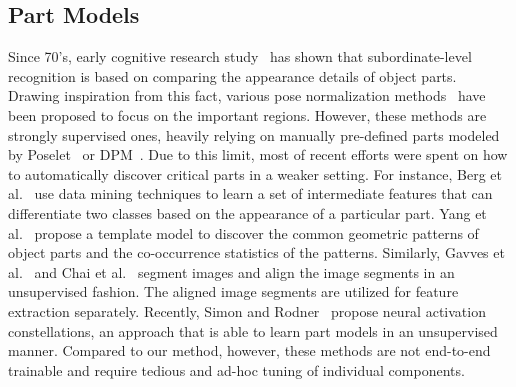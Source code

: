 \documentclass[10pt,twocolumn,letterpaper]{article}
\begin{document}
\subsection{Part Models}
Since 70's, early cognitive research study~\cite{Rosch76} has shown that subordinate-level recognition is based on comparing the appearance details of object parts.
Drawing inspiration from this fact, various pose normalization methods~\cite{FarrellOZMDD11,ZhangFID13,ZhangPRDB14,bd10,bd11} have been proposed to focus on the important regions.
However, these methods are strongly supervised ones, heavily relying on manually pre-defined parts modeled by Poselet~\cite{BourdevM09} or DPM~\cite{FelzenszwalbGMR10}.
Due to this limit, most of recent efforts were spent on how to automatically discover critical parts in a weaker setting.
For instance, Berg et al.~\cite{bd9} use data mining techniques to learn a set of intermediate features that can differentiate two classes based on the appearance of a particular part.
Yang et al.~\cite{bd12} propose a template model to discover the common geometric patterns of object parts and the co-occurrence statistics of the patterns.
Similarly, Gavves et al.~\cite{bd13} and Chai et al.~\cite{bd14} segment images and align the image segments in an unsupervised fashion.
The aligned image segments are utilized for feature extraction separately.
Recently, Simon and Rodner~\cite{bd28} propose neural activation constellations, an approach that is able to learn part models in an unsupervised manner.
Compared to our method, however, these methods are not end-to-end trainable and require tedious and ad-hoc tuning of individual components.


\end{document}
